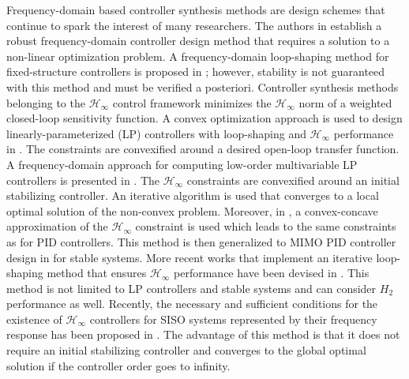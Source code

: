 \documentclass[a4paper, 10pt, conference]{ieeeconf}
\begin{document}

Frequency-domain based controller synthesis methods are design schemes that continue to spark the interest of many researchers. The authors in \cite{KNND13b} establish a robust frequency-domain controller design method that requires a solution to a non-linear optimization problem. A frequency-domain loop-shaping method for fixed-structure controllers is proposed in \cite{KNND13c}; however, stability is not guaranteed with this method and must be verified a posteriori. Controller synthesis methods belonging to the $\mathcal{H}_{\infty}$ control framework minimizes the $\mathcal{H}_{\infty}$ norm of a weighted closed-loop sensitivity function. A convex optimization approach is used to design linearly-parameterized (LP) controllers with loop-shaping and $\mathcal{H}_{\infty}$ performance in \cite{KG10}. The constraints are convexified around a desired open-loop transfer function. A frequency-domain approach for computing low-order multivariable LP controllers is presented in \cite{SOW10}. The $\mathcal{H}_{\infty}$ constraints are convexified around an initial stabilizing controller. An iterative algorithm is used that converges to a local optimal solution of the non-convex problem. Moreover, in \cite{HAB13},  a convex-concave approximation of the $\mathcal{H}_{\infty}$ constraint is used which leads to the same constraints as \cite{KG10} for PID controllers. This method is then generalized to MIMO PID controller design in \cite{BHA16} for stable systems. More recent works that implement an iterative loop-shaping method that ensures $\mathcal{H}_{\infty}$ performance have been devised in \cite{KK16}. This method is not limited to LP controllers and stable systems and can consider $H_2$ performance as well. Recently, the necessary and sufficient conditions for the existence of $\mathcal{H}_{\infty}$ controllers for SISO systems represented by their frequency response has been proposed in \cite{KNZ16}. The advantage of this method is that it does not require an initial stabilizing controller and converges to the global optimal solution if the controller order goes to infinity.
\end{document}

